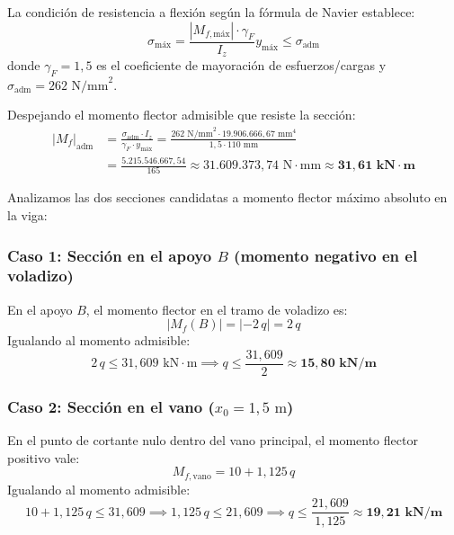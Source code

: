 
La condición de resistencia a flexión según la fórmula de Navier establece:
\begin{equation}
    \sigma_{\text{máx}} = \frac{|M_{f,\text{máx}}| \cdot \gamma_F}{I_z} y_{\text{máx}} \le \sigma_{\text{adm}}
\end{equation}
donde $\gamma_F = 1{,}5$ es el coeficiente de mayoración de esfuerzos/cargas y $\sigma_{\text{adm}} = 262\text{ N/mm}^2$.

Despejando el momento flector admisible que resiste la sección:
\begin{align}
    |M_f|_{\text{adm}} & = \frac{\sigma_{\text{adm}} \cdot I_z}{\gamma_F \cdot y_{\text{máx}}} = \frac{262\text{ N/mm}^2 \cdot 19.906.666{,}67\text{ mm}^4}{1{,}5 \cdot 110\text{ mm}} \nonumber \\
                       & = \frac{5.215.546.667{,}54}{165} \approx 31.609.373{,}74\text{ N}\cdot\text{mm} \approx \mathbf{31{,}61\text{ kN}\cdot\text{m}}
\end{align}

Analizamos las dos secciones candidatas a momento flector máximo absoluto en la viga:

\subsubsection*{Caso 1: Sección en el apoyo $B$ (momento negativo en el voladizo)}
En el apoyo $B$, el momento flector en el tramo de voladizo es:
\begin{equation}
    |M_f(B)| = |-2\,q| = 2\,q
\end{equation}
Igualando al momento admisible:
\begin{equation}
    2\,q \le 31{,}609\text{ kN}\cdot\text{m} \implies \boxed{q \le \frac{31{,}609}{2} \approx \mathbf{15{,}80\text{ kN/m}}}
\end{equation}

\subsubsection*{Caso 2: Sección en el vano ($x_0 = 1{,}5\text{ m}$)}
En el punto de cortante nulo dentro del vano principal, el momento flector positivo vale:
\begin{equation}
    M_{f,\text{vano}} = 10 + 1{,}125\,q
\end{equation}
Igualando al momento admisible:
\begin{equation}
    10 + 1{,}125\,q \le 31{,}609 \implies 1{,}125\,q \le 21{,}609 \implies \boxed{q \le \frac{21{,}609}{1{,}125} \approx \mathbf{19{,}21\text{ kN/m}}}
\end{equation}

